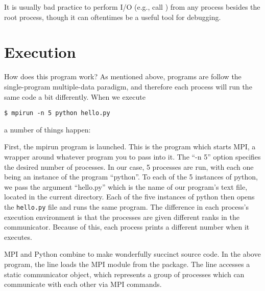 \begin{warn}
It is usually bad practice to perform I/O (e.g., call ) from any process besides the root process, though it can oftentimes be a useful tool for debugging.
\end{warn}

\section*{Execution}
How does this program work? As mentioned above,  programs are follow the single-program multiple-data paradigm, and therefore each process will run the same code a bit differently. When we execute 
\begin{lstlisting}[style=ShellInput]
$ mpirun -n 5 python hello.py
\end{lstlisting}
a number of things happen:

First, the mpirun program is launched. This is the program which starts MPI, a wrapper around whatever program you to pass into it. The ``-n 5'' option specifies the desired number of processes. In our case, 5 processes are run, with each one being an instance of the program ``python''. To each of the 5 instances of python, we pass the argument ``hello.py'' which is the name of our program's text file, located in the current directory. Each of the five instances of python then opens the \texttt{hello.py} file and runs the same program. The difference in each process's execution environment is that the processes are given different ranks in the communicator. Because of this, each process prints a different number when it executes.

MPI and Python combine to make wonderfully succinct source code. In the above program, the line  loads the MPI module from the  package. The line  accesses a static communicator object, which represents a group of processes which can communicate with each other via MPI commands.


